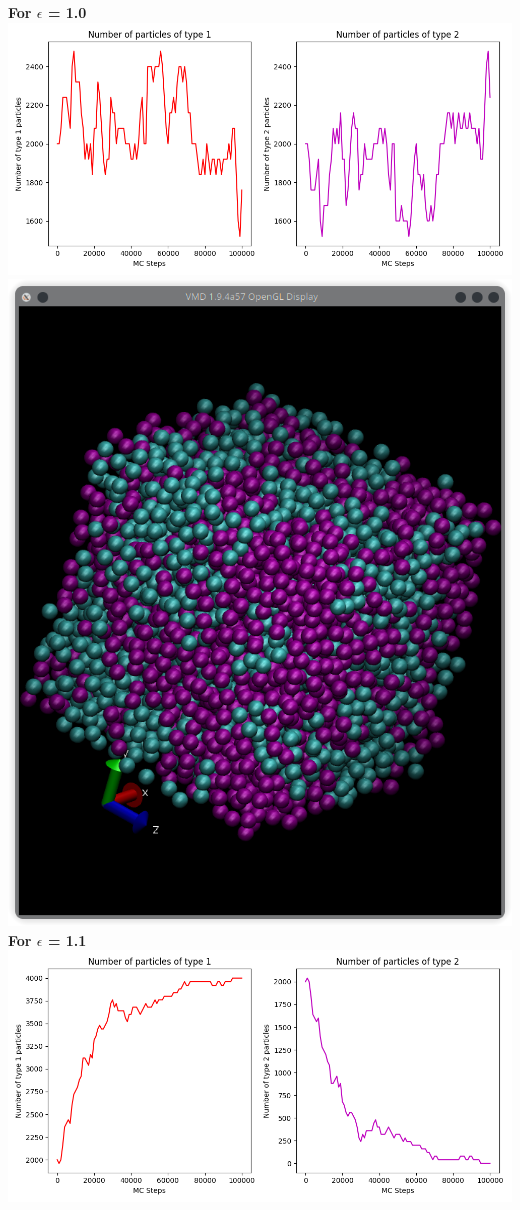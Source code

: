 \documentclass[11pt]{article}
\begin{document}
\textbf{For $\epsilon$ = 1.0} \\
\includegraphics[scale=0.5]{Q2b_10ePlot.png} \\
\includegraphics[scale=0.5]{Q2b_10eLF.png} \\
\textbf{For $\epsilon$ = 1.1} \\
\includegraphics[scale=0.5]{Q2b_11ePlot.png} \\
\end{document}
